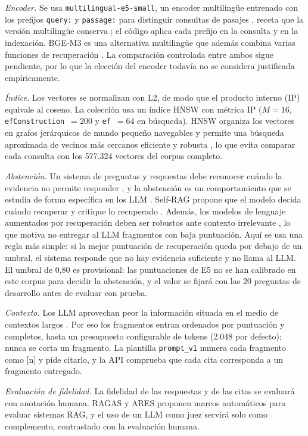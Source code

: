 \documentclass[conference]{IEEEtran}
\begin{document}
\textit{Encoder.} Se usa \texttt{multilingual-e5-small}, un encoder multilingüe entrenado con los prefijos \texttt{query:} y \texttt{passage:} para distinguir consultas de pasajes \cite{wang2022e5}, receta que la versión multilingüe conserva \cite{wang2024multilingual}; el código aplica cada prefijo en la consulta y en la indexación. BGE-M3 es una alternativa multilingüe que además combina varias funciones de recuperación \cite{chen2024bge}. La comparación controlada entre ambos sigue pendiente, por lo que la elección del encoder todavía no se considera justificada empíricamente.

\textit{Índice.} Los vectores se normalizan con L2, de modo que el producto interno (IP) equivale al coseno. La colección usa un índice HNSW con métrica IP ($M=16$, \texttt{efConstruction}~$=200$ y \texttt{ef}~$=64$ en búsqueda). HNSW organiza los vectores en grafos jerárquicos de mundo pequeño navegables y permite una búsqueda aproximada de vecinos más cercanos eficiente y robusta \cite{malkov2018}, lo que evita comparar cada consulta con los 577.324 vectores del corpus completo.

\textit{Abstención.} Un sistema de preguntas y respuestas debe reconocer cuándo la evidencia no permite responder \cite{rajpurkar2018}, y la abstención es un comportamiento que se estudia de forma específica en los LLM \cite{wen2024}. Self-RAG propone que el modelo decida cuándo recuperar y critique lo recuperado \cite{asai2023}. Además, los modelos de lenguaje aumentados por recuperación deben ser robustos ante contexto irrelevante \cite{yoran2023}, lo que motiva no entregar al LLM fragmentos con baja puntuación. Aquí se usa una regla más simple: si la mejor puntuación de recuperación queda por debajo de un umbral, el sistema responde que no hay evidencia suficiente y no llama al LLM. El umbral de 0,80 es provisional: las puntuaciones de E5 no se han calibrado en este corpus para decidir la abstención, y el valor se fijará con las 20 preguntas de desarrollo antes de evaluar con prueba.

\textit{Contexto.} Los LLM aprovechan peor la información situada en el medio de contextos largos \cite{liu2024}. Por eso los fragmentos entran ordenados por puntuación y completos, hasta un presupuesto configurable de tokens (2.048 por defecto); nunca se corta un fragmento. La plantilla \texttt{prompt\_v1} numera cada fragmento como [n] y pide citarlo, y la API comprueba que cada cita corresponda a un fragmento entregado.

\textit{Evaluación de fidelidad.} La fidelidad de las respuestas y de las citas se evaluará con anotación humana. RAGAS \cite{es2023ragas} y ARES \cite{saadfalcon2023ares} proponen marcos automáticos para evaluar sistemas RAG, y el uso de un LLM como juez \cite{zheng2023} servirá solo como complemento, contrastado con la evaluación humana.
\end{document}

